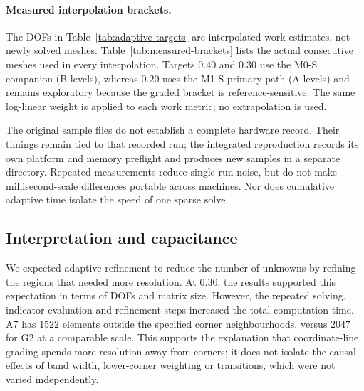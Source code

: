 \paragraph{Measured interpolation brackets.}
The DOFs in Table~\ref{tab:adaptive-targets} are interpolated work estimates, not newly solved meshes. Table~\ref{tab:measured-brackets} lists the actual consecutive meshes used in every interpolation. Targets $0.40$ and $0.30$ use the M0-S companion (B levels), whereas $0.20$ uses the M1-S primary path (A levels) and remains exploratory because the graded bracket is reference-sensitive. The same log-linear weight is applied to each work metric; no extrapolation is used.
\begin{table}[H]\centering\footnotesize
\caption{Actual measured endpoints behind the target estimates. Sensitivity is the maximum over the two endpoints; the full CSV also records NNZ and interpolation weights.}
\label{tab:measured-brackets}
\end{table}
\begin{table}[H]\centering\small
\caption{Median and interquartile range of selected original timing samples. Every level uses one warm-up and five measured repetitions. Adaptive totals are cumulative; fixed-mesh totals are one-shot. IQR describes repeat variability, not a confidence interval.}
\label{tab:timing-iqr}
\end{table}
The original sample files do not establish a complete hardware record. Their timings remain tied to that recorded run; the integrated reproduction records its own platform and memory preflight and produces new samples in a separate directory. Repeated measurements reduce single-run noise, but do not make millisecond-scale differences portable across machines. Nor does cumulative adaptive time isolate the speed of one sparse solve.

\subsection{Interpretation and capacitance}
We expected adaptive refinement to reduce the number of unknowns by refining the regions that needed more resolution. At $0.30$, the results supported this expectation in terms of DOFs and matrix size. However, the repeated solving, indicator evaluation and refinement steps increased the total computation time. A7 has $1522$ elements outside the specified corner neighbourhoods, versus $2047$ for G2 at a comparable scale. This supports the explanation that coordinate-line grading spends more resolution away from corners; it does not isolate the causal effects of band width, lower-corner weighting or transitions, which were not varied independently.

